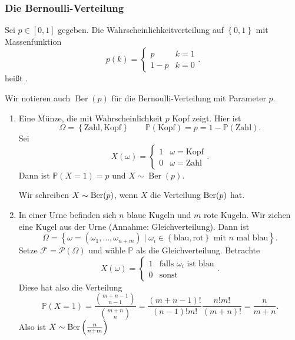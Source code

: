 \subsubsection{Die Bernoulli-Verteilung}
\begin{definition}\label{def:bernoulli-verteilung}
    Sei $p\in [0,1]$ gegeben. Die Wahrscheinlichkeitverteilung auf $\left \{0,1\right\} $ mit Massenfunktion
    \[
        p(k) = \begin{cases}
            p & k = 1 \\
            1-p & k = 0
        \end{cases}
    .\] 
        heißt . 
\end{definition}
\begin{notation}
    Wir notieren auch $\operatorname{Ber} (p)$ für die Bernoulli-Verteilung mit Parameter $p$.
\end{notation}
\begin{example}
    \begin{enumerate}[label=\protect\circled{\alph*}]
        \item Eine Münze, die mit Wahrscheinlichkeit $p$ Kopf zeigt. Hier ist
             \[
                 \Omega = \left \{\text{Zahl}, \text{Kopf}\right\} \qquad \mathbb{P}(\text{Kopf}) = p = 1-\mathbb{P}(\text{Zahl})
            .\] 
            Sei
            \[
                X(\omega) = \begin{cases}
                    1 & \omega = \text{Kopf} \\
                    0 & \omega = \text{Zahl}
                \end{cases}
            .\] 
            Dann ist $\mathbb{P}(X = 1) = p$ und $X \sim  \operatorname{Ber} (p)$.
            \begin{notation}
                Wir schreiben $X \sim \operatorname{Ber}(p)$, wenn $X$ die Verteilung  $\operatorname{Ber}(p)$ hat.
            \end{notation}
        \item In einer Urne befinden sich $n$ blaue Kugeln und  $m$ rote Kugeln. Wir ziehen eine Kugel aus der Urne (Annahme: Gleichverteilung). Dann ist
            \[
                \Omega = \left \{\omega = (\omega_1,\ldots,\omega_{n+m}) \mid \omega_i \in  \left \{\text{blau},\text{rot}\right\} \text{ mit $n$ mal blau} \right\} 
            .\] 
            Setze $\mathcal{F}= \mathcal{P}(\Omega)$ und wähle $\mathbb{P}$ als die Gleichverteilung. Betrachte
            \[
                X(\omega) = \begin{cases}
                    1 & \text{falls $\omega_i$ ist blau} \\
                    0 & \text{sonst}
                \end{cases}
            .\] 
Diese hat also die Verteilung
\[
    \mathbb{P}(X = 1) = \frac{\binom{m+n-1}{n-1}}{\binom{m+n}{n}} = \frac{(m+n-1)!}{(n-1)! m!} \frac{n! m!}{(m+n)!} = \frac{n}{m+n}
.\] 
Also ist $X \sim \operatorname{Ber}\left( \frac{n}{n+m} \right) $
    \end{enumerate}
\end{example}


